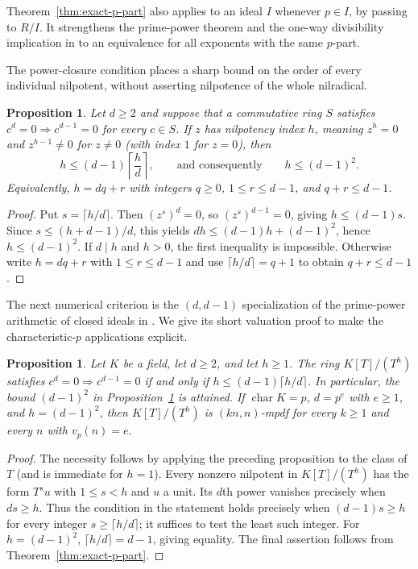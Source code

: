 \documentclass[11pt,a4paper]{amsart}
\newtheorem{proposition}[theorem]{Proposition}
\theoremstyle{definition}
\theoremstyle{remark}
\numberwithin{equation}{section}
\begin{document}
Theorem~\ref{thm:exact-p-part} also applies to an ideal $I$ whenever
$p\in I$, by passing to $R/I$. It strengthens the prime-power theorem
and the one-way divisibility implication in \cite{TS} to an equivalence for all exponents with the same $p$-part.

The power-closure condition places a sharp bound on the order of every
individual nilpotent, without asserting nilpotence of the whole nilradical.

\begin{proposition}\label{prop:nilpotent-index}
Let $d\geq2$ and suppose that a commutative ring $S$ satisfies
$c^d=0\Rightarrow c^{d-1}=0$ for every $c\in S$.
If $z$ has nilpotency index $h$, meaning $z^h=0$ and $z^{h-1}\neq0$
for $z\neq0$ (with index $1$ for $z=0$), then
\[
 h\leq(d-1)\left\lceil\frac hd\right\rceil,
 \qquad\text{and consequently}\qquad h\leq(d-1)^2.
\]
Equivalently, $h=dq+r$ with integers $q\geq0$, $1\leq r\leq d-1$,
and $q+r\leq d-1$.
\end{proposition}
\begin{proof}
Put $s=\lceil h/d\rceil$. Then $(z^s)^d=0$, so
$(z^s)^{d-1}=0$, giving $h\leq(d-1)s$.
Since $s\leq(h+d-1)/d$, this yields
$dh\leq(d-1)h+(d-1)^2$, hence $h\leq(d-1)^2$.
If $d\mid h$ and $h>0$, the first inequality is impossible.
Otherwise write $h=dq+r$ with $1\leq r\leq d-1$ and use
$\lceil h/d\rceil=q+1$ to obtain $q+r\leq d-1$.
\end{proof}

The next numerical criterion is the $(d,d-1)$ specialization of the
prime-power arithmetic of closed ideals in \cite[Theorem~3.1]{ABclosed}.
We give its short valuation proof to make the characteristic-$p$
applications explicit.

\begin{proposition}\label{prop:truncated-nilpotent}
Let $K$ be a field, let $d\geq2$, and let $h\geq1$.
The ring $K[T]/(T^h)$ satisfies $c^d=0\Rightarrow c^{d-1}=0$ if and only if
$h\leq(d-1)\lceil h/d\rceil$.
In particular, the bound $(d-1)^2$ in
Proposition~\ref{prop:nilpotent-index} is attained.
If $\operatorname{char}K=p$, $d=p^e$ with $e\geq1$, and
$h=(d-1)^2$, then $K[T]/(T^h)$ is $(kn,n)$-mpdf for every $k\geq1$
and every $n$ with $v_p(n)=e$.
\end{proposition}
\begin{proof}
The necessity follows by applying the preceding proposition to the class
of $T$ (and is immediate for $h=1$). Every nonzero nilpotent in
$K[T]/(T^h)$ has the form $T^s u$ with $1\leq s<h$ and $u$ a unit.
Its $d$th power vanishes precisely when $ds\geq h$.
Thus the condition in the statement holds precisely when
$(d-1)s\geq h$ for every integer $s\geq\lceil h/d\rceil$; it suffices to
test the least such integer. For $h=(d-1)^2$,
$\lceil h/d\rceil=d-1$, giving equality.
The final assertion follows from Theorem~\ref{thm:exact-p-part}.
\end{proof}
\end{document}
